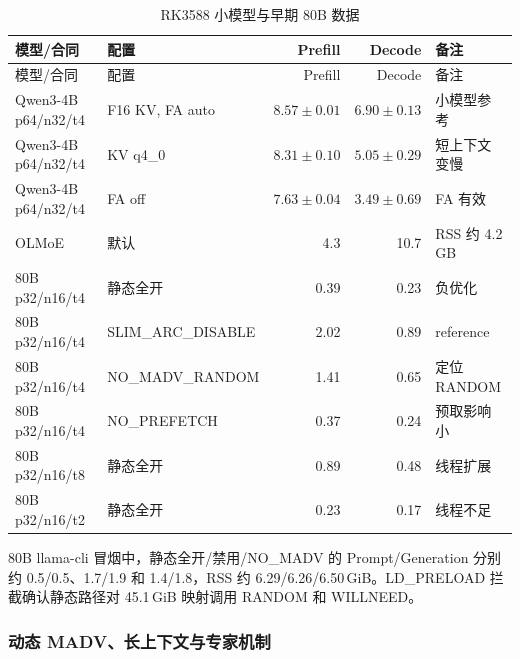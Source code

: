 \begin{longtable}{p{}p{}rrp{}}
  \caption{RK3588 小模型与早期 80B 数据}\label{tab:appendix-rk-early}\\
  \toprule
  模型/合同 & 配置 & Prefill & Decode & 备注 \\
  \midrule
  \endfirsthead
  \toprule 模型/合同 & 配置 & Prefill & Decode & 备注 \\
  \midrule
  \endhead
  Qwen3-4B p64/n32/t4 & F16 KV, FA auto & $8.57\pm0.01$ & $6.90\pm0.13$ & 小模型参考 \\
  Qwen3-4B p64/n32/t4 & KV q4\_0 & $8.31\pm0.10$ & $5.05\pm0.29$ & 短上下文变慢 \\
  Qwen3-4B p64/n32/t4 & FA off & $7.63\pm0.04$ & $3.49\pm0.69$ & FA 有效 \\
  OLMoE & 默认 & 4.3 & 10.7 & RSS 约 4.2\,GB \\
  80B p32/n16/t4 & 静态全开 & 0.39 & 0.23 & 负优化 \\
  80B p32/n16/t4 & SLIM\_ARC\_DISABLE & 2.02 & 0.89 & reference \\
  80B p32/n16/t4 & NO\_MADV\_RANDOM & 1.41 & 0.65 & 定位 RANDOM \\
  80B p32/n16/t4 & NO\_PREFETCH & 0.37 & 0.24 & 预取影响小 \\
  80B p32/n16/t8 & 静态全开 & 0.89 & 0.48 & 线程扩展 \\
  80B p32/n16/t2 & 静态全开 & 0.23 & 0.17 & 线程不足 \\
  \bottomrule
\end{longtable}

80B llama-cli 冒烟中，静态全开/禁用/NO\_MADV 的 Prompt/Generation 分别约 0.5/0.5、1.7/1.9 和 1.4/1.8，RSS 约 6.29/6.26/6.50\,GiB。LD\_PRELOAD 拦截确认静态路径对 45.1\,GiB 映射调用 RANDOM 和 WILLNEED。

\subsubsection{动态 MADV、长上下文与专家机制}


